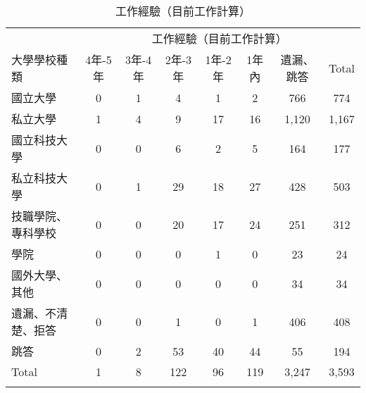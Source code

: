 \documentclass[12pt, a4paper]{article}
\begin{document}
\begin{table}[ht]
\centering
\renewcommand{\arraystretch}{1.3} %
\extrarowheight=5pt
\caption{工作經驗（目前工作計算）}
\begin{adjustbox}{width=\textwidth}
\begin{tabular}{l*{7}{c}}
\toprule
& \multicolumn{7}{c}{工作經驗（目前工作計算）} \\
\cmidrule(lr){2-8}
\multirow{2}{*}{大學學校種類} & \multirow{2}{*}{4年-5年} & \multirow{2}{*}{3年-4年} & \multirow{2}{*}{2年-3年} & \multirow{2}{*}{1年-2年} & \multirow{2}{*}{1年內} & \multirow{2}{*}{遺漏、跳答} & \multirow{2}{*}{Total} \\
&  &  & &  & &、不清楚、跳答 &  \\
\midrule
國立大學 & 0 & 1 & 4 & 1 & 2 & 766 & 774 \\
私立大學 & 1 & 4 & 9 & 17 & 16 & 1,120 & 1,167 \\
國立科技大學 & 0 & 0 & 6 & 2 & 5 & 164 & 177 \\
私立科技大學 & 0 & 1 & 29 & 18 & 27 & 428 & 503 \\
技職學院、專科學校 & 0 & 0 & 20 & 17 & 24 & 251 & 312 \\
學院 & 0 & 0 & 0 & 1 & 0 & 23 & 24 \\
國外大學、其他 & 0 & 0 & 0 & 0 & 0 & 34 & 34 \\
遺漏、不清楚、拒答 & 0 & 0 & 1 & 0 & 1 & 406 & 408 \\
跳答 & 0 & 2 & 53 & 40 & 44 & 55 & 194 \\
Total & 1 & 8 & 122 & 96 & 119 & 3,247 & 3,593 \\
\bottomrule
\label{tab:exper_curret}
\end{tabular}
\end{adjustbox}
\end{table}
\end{document}
